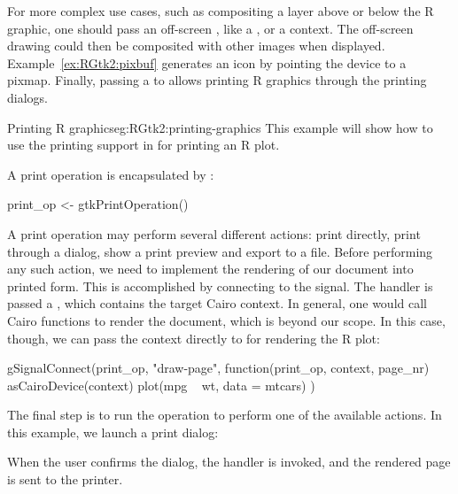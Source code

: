 For more complex use cases, such as compositing a layer above or below
the R graphic, one should pass an off-screen , like
a , or a  context. The off-screen
drawing could then be composited with other images when
displayed. Example~\ref{ex:RGtk2:pixbuf} generates an icon by pointing
the device to a pixmap. Finally, passing a  to
 allows printing R graphics through the \GTK\/
printing dialogs.

\begin{example}{Printing R graphics}{eg:RGtk2:printing-graphics}
  This example will show how to use the printing support in \GTK\/ for
  printing an R plot. 
  
  A print operation is encapsulated by :
\begin{Schunk}
\begin{Sinput}
 print_op <- gtkPrintOperation()
\end{Sinput}
\end{Schunk}
%
A print operation may perform several different actions: print
directly, print through a dialog, show a print preview and export to a
file. Before performing any such action, we need to implement the
rendering of our document into printed form. This is accomplished by
connecting to the  signal. The handler is passed a
, which contains the target Cairo context. In
general, one would call Cairo functions to render the document, which
is beyond our scope. In this case, though, we can pass the context
directly to  for rendering the R plot:
\begin{Schunk}
\begin{Sinput}
 gSignalConnect(print_op, "draw-page", 
                function(print_op, context, page_nr) {
                  asCairoDevice(context)
                  plot(mpg ~ wt, data = mtcars)
                })
\end{Sinput}
\end{Schunk}
%
  The final step is to run the operation to perform one of the
  available actions. In this example, we launch a print dialog:
\begin{Schunk}
\end{Schunk}
% 
  When the user confirms the dialog, the
   handler is invoked, and the
  rendered page is sent to the printer.
\end{example}

